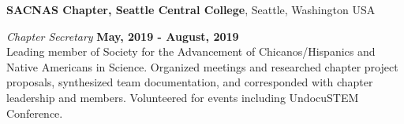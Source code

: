 \documentclass[margin,line]{res}
\begin{document}
\begin{resume}
{\bf SACNAS Chapter, Seattle Central College}, Seattle, Washington USA

\vspace{-.3cm}
{\em Chapter Secretary} \hfill {\bf May, 2019 - August, 2019}\\
Leading member of Society for the Advancement of Chicanos/Hispanics and Native Americans in Science.
  Organized meetings and researched chapter project proposals, synthesized team documentation, and 
  corresponded with chapter leadership and members. Volunteered for events including UndocuSTEM Conference.

\end{resume}
\end{document}
